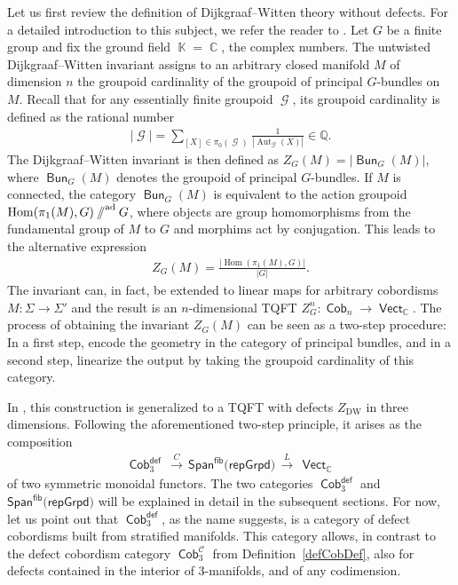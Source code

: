 \documentclass[10pt,a4paper]{amsart}
\DeclareMathOperator{\Hom}{Hom}
\DeclareMathOperator{\Aut}{Aut}
\DeclareMathOperator{\Bun}{\mathsf{Bun}}
\DeclareMathOperator{\vect}{\mathsf{Vect}}
\DeclareMathOperator{\K}{\mathbb{K}}
\DeclareMathOperator{\C}{\mathbb{C}}
\DeclareMathOperator{\Cob}{\mathsf{Cob}}
\DeclareMathOperator{\calc}{\mathcal{C}}
\DeclareMathOperator{\calg}{\mathcal{G}}
\newcommand{\sslash}{\mathbin{/\mkern-6mu/}}
\numberwithin{equation}{section}
\theoremstyle{definition}
\begin{document}
Let us first review the definition of Dijkgraaf--Witten theory without defects. For a detailed introduction to this subject, we refer the reader to \cite{FSW}. Let $G$ be a finite group and fix the ground field $\K = \C$, the complex numbers. The untwisted Dijkgraaf--Witten invariant assigns to an arbitrary closed manifold $M$ of dimension $n$ the groupoid cardinality of the groupoid of principal $G$-bundles on $M$. Recall that for any essentially finite groupoid $\calg$, its groupoid cardinality is defined as the rational number
\begin{align}
 \label{eqGrCard}
 |\calg| = \sum_{[X] \in \pi_0(\calg)}\frac{1}{|{\Aut_{\calg}(X)}|} \in \mathbb{Q}.
\end{align}
The Dijkgraaf--Witten invariant is then defined as $Z_G(M) = |{\Bun_G(M)}|$, where $\Bun_G(M)$ denotes the groupoid of principal $G$-bundles. If $M$ is connected, the category $\Bun_G(M)$ is equivalent to the action groupoid $\Hom(\pi_1(M), G)\sslash^{\mathrm{ad}} G$, where objects are group homomorphisms from the fundamental group of $M$ to $G$ and morphims act by conjugation. This leads to the alternative expression
\begin{align*}
 Z_G(M) = \frac{|{\Hom(\pi_1(M), G)|}}{|G|}.
\end{align*}
The invariant can, in fact, be extended to linear maps for arbitrary cobordisms $M\colon \Sigma \rightarrow \Sigma'$ and the result is an $n$-dimensional TQFT $Z_G^n\colon \Cob_n \rightarrow \vect_{\C}$. The process of obtaining the invariant $Z_G(M)$ can be seen as a two-step procedure: In a first step, encode the geometry in the category of principal bundles, and in a second step, linearize the output by taking the groupoid cardinality of this category.

In \cite{FMM}, this construction is generalized to a TQFT with defects $Z_{\mathrm{DW}}$ in three dimensions. Following the aforementioned two-step principle, it arises as the composition
\begin{align}
 \label{eqDefCob}
 \Cob_3^{\mathsf{def}} \, \xrightarrow{C} \, \mathsf{Span}^{\mathsf{fib}}(\mathsf{repGrpd)} \, \xrightarrow{L} \, \vect_{\C}
\end{align}
of two symmetric monoidal functors. The two categories $\Cob_3^{\mathsf{def}}$ and $\mathsf{Span}^{\mathsf{fib}}(\mathsf{repGrpd)}$ will be explained in detail in the subsequent sections. For now, let us point out that $\Cob_3^{\mathsf{def}}$, as the name suggests, is a category of defect cobordisms built from stratified manifolds. This category allows, in contrast to the defect cobordism category $\Cob_3^{\calc}$ from Definition~\ref{defCobDef}, also for defects contained in the interior of 3-manifolds, and of any codimension.
\end{document}
